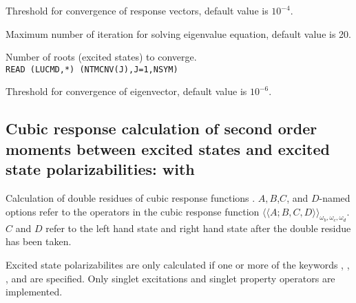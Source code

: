 \begin{description}
\item{}
Threshold for convergence of response vectors, default value is $10^{-4}$.

\item{}
Maximum number of iteration for solving eigenvalue equation, default
value is 20.

\item{}
Number of roots (excited states) to converge. \\
\verb|READ (LUCMD,*) (NTMCNV(J),J=1,NSYM)|\\

\item{}
Threshold for convergence of eigenvector, default value is $10^{-6}$.

\end{description}


\subsection{Cubic response calculation of second order moments 
between excited states and excited state polarizabilities:
 with }
Calculation of double residues of
cubic response functions
\cite{pndjovhacpl242,djpnhajcp105,pndjhapdkrthhkcpl253}.
$A,B$,$C$, and $D$-named options refer to the operators in the cubic
response function 
$\langle\!\langle A;B,C,D \rangle\!\rangle_{\omega_b,\omega_c,\omega_d}$.
$C$ and $D$ refer to the left hand state and right hand state
after the double residue has been taken.

Excited state polarizabilites are only calculated if one or more of the keywords
, , , and 
are specified.
Only singlet excitations and singlet property operators are implemented.

